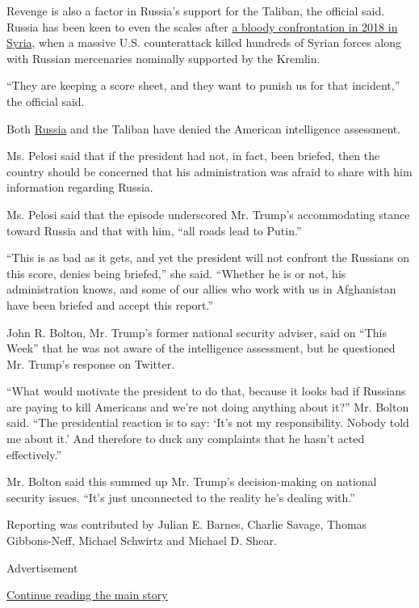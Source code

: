 Revenge is also a factor in Russia's support for the Taliban, the
official said. Russia has been keen to even the scales after
\href{https://www.nytimes.com/2018/05/24/world/middleeast/american-commandos-russian-mercenaries-syria.html}{a
bloody confrontation in 2018 in Syria}, when a massive U.S.
counterattack killed hundreds of Syrian forces along with Russian
mercenaries nominally supported by the Kremlin.

``They are keeping a score sheet, and they want to punish us for that
incident,'' the official said.

Both
\href{https://twitter.com/RusEmbUSA/status/1276998092261339137}{Russia}
and the Taliban have denied the American intelligence assessment.

Ms. Pelosi said that if the president had not, in fact, been briefed,
then the country should be concerned that his administration was afraid
to share with him information regarding Russia.

Ms. Pelosi said that the episode underscored Mr. Trump's accommodating
stance toward Russia and that with him, ``all roads lead to Putin.''

``This is as bad as it gets, and yet the president will not confront the
Russians on this score, denies being briefed,'' she said. ``Whether he
is or not, his administration knows, and some of our allies who work
with us in Afghanistan have been briefed and accept this report.''

John R. Bolton, Mr. Trump's former national security adviser, said on
``This Week'' that he was not aware of the intelligence assessment, but
he questioned Mr. Trump's response on Twitter.

``What would motivate the president to do that, because it looks bad if
Russians are paying to kill Americans and we're not doing anything about
it?'' Mr. Bolton said. ``The presidential reaction is to say: `It's not
my responsibility. Nobody told me about it.' And therefore to duck any
complaints that he hasn't acted effectively.''

Mr. Bolton said this summed up Mr. Trump's decision-making on national
security issues. ``It's just unconnected to the reality he's dealing
with.''

Reporting was contributed by Julian E. Barnes, Charlie Savage, Thomas
Gibbons-Neff, Michael Schwirtz and Michael D. Shear.

Advertisement

\protect\hyperlink{after-bottom}{Continue reading the main story}

